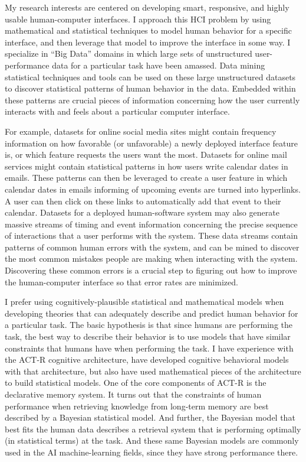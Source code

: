 My research interests are centered on developing smart, responsive, and highly usable human-computer interfaces.
I approach this HCI problem by using mathematical and statistical techniques to model human behavior for a specific interface, and then leverage that model to improve the interface in some way.
I specialize in ``Big Data'' domains in which large sets of unstructured user-performance data for a particular task have been amassed.
Data mining statistical techniques and tools can be used on these large unstructured datasets to discover statistical patterns of human behavior in the data.
Embedded within these patterns are crucial pieces of information concerning how the user currently interacts with and feels about a particular computer interface.

For example, datasets for online social media sites might contain frequency information on how favorable (or unfavorable) a newly deployed interface feature is,
or which feature requests the users want the most.
Datasets for online mail services might contain statistical patterns in how users write calendar dates in emails.
These patterns can then be leveraged to create a user feature in which calendar dates in emails informing of upcoming events are turned into hyperlinks.
A user can then click on these links to automatically add that event to their calendar.
Datasets for a deployed human-software system may also generate massive streams of timing and event information concerning the precise sequence of interactions that a user performs with the system.
These data streams contain patterns of common human errors with the system, and can be mined to discover the most common mistakes people are making when interacting with the system.
Discovering these common errors is a crucial step to figuring out how to improve the human-computer interface so that error rates are minimized.

I prefer using cognitively-plausible statistical and mathematical models when developing theories that can adequately describe and predict human behavior for a particular task.
The basic hypothesis is that since humans are performing the task, the best way to describe their behavior is to use models that have similar constraints that humans have when performing the task.
I have experience with the ACT-R cognitive architecture, have developed cognitive behavioral models with that architecture,
but also have used mathematical pieces of the architecture to build statistical models.
One of the core components of ACT-R is the declarative memory system.
It turns out that the constraints of human performance when retrieving knowledge from long-term memory are best described by a Bayesian statistical model.
And further, the Bayesian model that best fits the human data describes a retrieval system that is performing optimally (in statistical terms) at the task.
And these same Bayesian models are commonly used in the AI machine-learning fields, since they have strong performance there.

